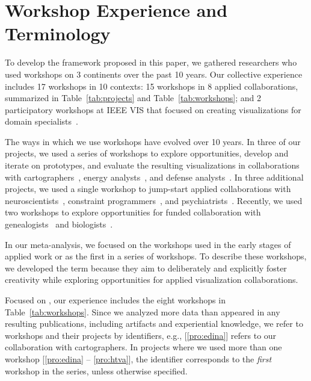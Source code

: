 


\section{Workshop Experience and Terminology}
\label{sec:experience}

To develop the \workshop framework proposed in this paper, we gathered researchers who used workshops on 3 continents over the past 10 years. Our collective experience includes 17 workshops in 10 contexts: 15 workshops in 8 applied collaborations, summarized in Table~\ref{tab:projects} and Table~\ref{tab:workshops}; and 2 participatory workshops at IEEE VIS that focused on creating visualizations for domain specialists~\cite{Rogers2016,Rogers2017}.

The ways in which we use workshops have evolved over 10 years. In three of our projects, we used a series of workshops to explore opportunities, develop and iterate on prototypes, and evaluate the resulting visualizations in collaborations with cartographers~\cite{Dykes2010}, energy analysts~\cite{Goodwin2013}, and defense analysts~\cite{Walker2013}. In three additional projects, we used a single workshop to jump-start applied collaborations with neuroscientists~\cite{Kerzner2017}, constraint programmers~\cite{Goodwin2016}, and psychiatrists~\cite{Nobre2017}.  Recently, we used two workshops to explore opportunities for funded collaboration with genealogists~\cite{Kerzner2017:utdb} and biologists~\cite{Lisle2017}.

In our meta-analysis, we focused on the workshops used in the early stages of applied work or as the first in a series of workshops. To describe these workshops, we developed the term \workshops because they aim to deliberately and explicitly foster creativity while exploring opportunities for applied visualization collaborations.

Focused on \workshops, our experience includes the eight workshops in Table~\ref{tab:workshops}. Since we analyzed more data than appeared in any resulting publications, including artifacts and experiential knowledge, we refer to workshops and their projects by identifiers, e.g., [\ref{pro:edina}] refers to our collaboration with cartographers. In projects where we used more than one workshop [\ref{pro:edina} -- \ref{pro:htva}], the identifier corresponds to the {\it first} workshop in the series, unless otherwise specified. 

